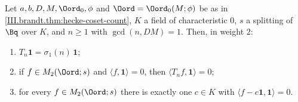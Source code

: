 Let $a,b,D,M,\Oord_0,\phi$ and $\Oord=\Oord_0(M;\phi)$ be as in \cref{III.brandt.thm:hecke-coset-count}, $K$ a field of characteristic $0$, $s$ a
splitting of $\Bq$ over $K$, and $n\ge1$ with $\gcd(n,DM)=1$. Then, in weight $2$:
\begin{enumerate}[label=(\alph*)]
\item $T_n\mathbf 1=\sigma_1(n)\,\mathbf 1$;
\item if $f\in M_2(\Oord;s)$ and $\langle f,\mathbf 1\rangle=0$, then $\langle T_nf,\mathbf 1\rangle=0$;
\item for every $f\in M_2(\Oord;s)$ there is exactly one $c\in K$ with $\langle f-c\mathbf 1,\mathbf 1\rangle=0$.
\end{enumerate}
